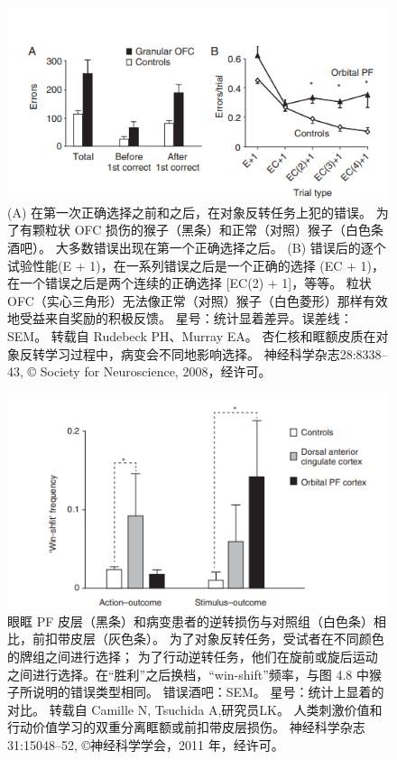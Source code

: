 \begin{figure}[!htb]
	\centering
	\includegraphics{image_pfc/Fig_4_8}
	\caption{(A) 在第一次正确选择之前和之后，在对象反转任务上犯的错误。 为了有颗粒状 OFC 损伤的猴子（黑条）和正常（对照）猴子（白色条酒吧）。 大多数错误出现在第一个正确选择之后。 (B) 错误后的逐个试验性能(E + 1)，在一系列错误之后是一个正确的选择 (EC + 1)，在一个错误之后是两个连续的正确选择 [EC(2) + 1]，等等。 粒状OFC（实心三角形）无法像正常（对照）猴子（白色菱形）那样有效地受益来自奖励的积极反馈。 星号：统计显着差异。误差线：SEM。 转载自 Rudebeck PH、Murray EA。 杏仁核和眶额皮质在对象反转学习过程中，病变会不同地影响选择。 神经科学杂志28:8338–43, © Society for Neuroscience, 2008，经许可。}
	\label{fig:fig_4_8}
\end{figure}
\begin{figure}[!htb]
	\centering
	\includegraphics{image_pfc/Fig_4_9}
	\caption{眼眶 PF 皮层（黑条）和病变患者的逆转损伤与对照组（白色条）相比，前扣带皮层（灰色条）。 为了对象反转任务，受试者在不同颜色的牌组之间进行选择； 为了行动逆转任务，他们在旋前或旋后运动之间进行选择。在“胜利”之后换档，“win-shift”频率，与图 4.8 中猴子所说明的错误类型相同。 错误酒吧：SEM。 星号：统计上显着的对比。 转载自 Camille N, Tsuchida A,研究员LK。 人类刺激价值和行动价值学习的双重分离眶额或前扣带皮层损伤。 神经科学杂志 31:15048–52, ©神经科学学会，2011 年，经许可。}
	\label{fig:fig_4_9}
\end{figure}
